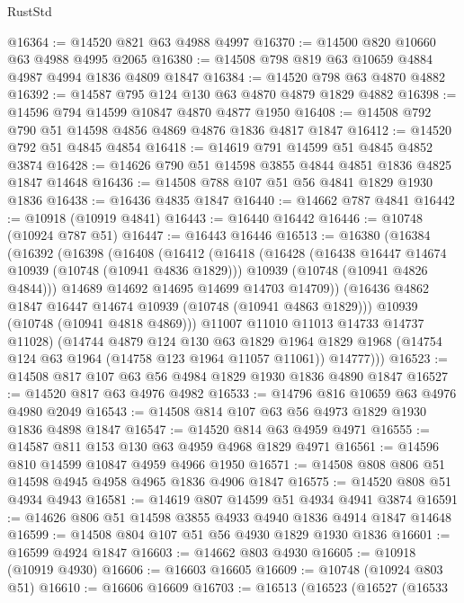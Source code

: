 \begin{lexlean}{RustStd}
\begin{coremodule}
@16364 := @14520 @821 @63 @4988 @4997
@16370 := @14500 @820 @10660 @63 @4988 @4995 @2065
@16380 := @14508 @798 @819 @63 @10659 @4884 @4987 @4994 @1836 @4809 @1847
@16384 := @14520 @798 @63 @4870 @4882
@16392 := @14587 @795 @124 @130 @63 @4870 @4879 @1829 @4882
@16398 := @14596 @794 @14599 @10847 @4870 @4877 @1950
@16408 := @14508 @792 @790 @51 @14598 @4856 @4869 @4876 @1836 @4817 @1847
@16412 := @14520 @792 @51 @4845 @4854
@16418 := @14619 @791 @14599 @51 @4845 @4852 @3874
@16428 := @14626 @790 @51 @14598 @3855 @4844 @4851 @1836 @4825 @1847 @14648
@16436 := @14508 @788 @107 @51 @56 @4841 @1829 @1930 @1836
@16438 := @16436 @4835 @1847
@16440 := @14662 @787 @4841
@16442 := @10918 (@10919 @4841)
@16443 := @16440 @16442
@16446 := @10748 (@10924 @787 @51)
@16447 := @16443 @16446
@16513 := @16380
    (@16384
      (@16392
        (@16398
          (@16408
            (@16412
              (@16418
                (@16428
                  (@16438 @16447 @14674 @10939 (@10748 (@10941 @4836 @1829)))
                  @10939
                  (@10748 (@10941 @4826 @4844)))
                @14689
                @14692
                @14695
                @14699
                @14703
                @14709))
            (@16436 @4862 @1847 @16447 @14674 @10939 (@10748 (@10941 @4863 @1829)))
            @10939
            (@10748 (@10941 @4818 @4869)))
          @11007
          @11010
          @11013
          @14733
          @14737
          @11028)
        (@14744
          @4879
          @124
          @130
          @63
          @1829
          @1964
          @1829
          @1968
          (@14754 @124 @63 @1964 (@14758 @123 @1964 @11057 @11061))
          @14777)))
@16523 := @14508 @817 @107 @63 @56 @4984 @1829 @1930 @1836 @4890 @1847
@16527 := @14520 @817 @63 @4976 @4982
@16533 := @14796 @816 @10659 @63 @4976 @4980 @2049
@16543 := @14508 @814 @107 @63 @56 @4973 @1829 @1930 @1836 @4898 @1847
@16547 := @14520 @814 @63 @4959 @4971
@16555 := @14587 @811 @153 @130 @63 @4959 @4968 @1829 @4971
@16561 := @14596 @810 @14599 @10847 @4959 @4966 @1950
@16571 := @14508 @808 @806 @51 @14598 @4945 @4958 @4965 @1836 @4906 @1847
@16575 := @14520 @808 @51 @4934 @4943
@16581 := @14619 @807 @14599 @51 @4934 @4941 @3874
@16591 := @14626 @806 @51 @14598 @3855 @4933 @4940 @1836 @4914 @1847 @14648
@16599 := @14508 @804 @107 @51 @56 @4930 @1829 @1930 @1836
@16601 := @16599 @4924 @1847
@16603 := @14662 @803 @4930
@16605 := @10918 (@10919 @4930)
@16606 := @16603 @16605
@16609 := @10748 (@10924 @803 @51)
@16610 := @16606 @16609
@16703 := @16513
    (@16523
      (@16527
        (@16533

\end{coremodule}
\end{lexlean}
